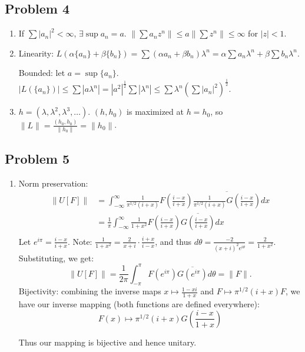 \documentclass[11pt]{article}
\newcommand{\intr}{\int_{-\infty}^{\infty}}
\begin{document}
\subsection*{Problem 4}
\begin{enumerate}
\item If $\sum|a_n|^2 < \infty$, $\exists \sup{a_n} = a$. $\|\sum a_nz^n\| \leq
  a\|\sum z^n\| \leq \infty$ for $|z| < 1$.
\item Linearity: $L(\alpha\{a_n\}+\beta\{b_n\}) = \sum(\alpha a_n + \beta b_n)
  \lambda^n = \alpha\sum a_n\lambda^n + \beta\sum b_n \lambda^n$.

  Bounded: let $a = \sup \{a_n\}$. $|L(\{a_n\})| \leq \sum|a\lambda^n| = 
  |a^2|^{\frac{1}{2}}\sum|\lambda^n| \leq \sum\lambda^n(\sum|a_n|^2)^{\frac{1}{2}}$.
\item $h = (\lambda, \lambda^2, \lambda^3,\ldots)$. $(h, h_0)$ is maximized at
  $h = h_0$, so $\|L\|=\frac{(h_0,h_0)}{\|h_0\|} = \|h_0\|$.
\end{enumerate}

\subsection*{Problem 5}
\begin{enumerate}[label=\alph*)]
\item Norm preservation:
  \begin{align*}
    \|U[F]\|
    &= \intr \frac{1}{\pi^{1/2}(i+x)}F\left(\frac{i-x}{i+x}\right)\overline{
      \frac{1}{\pi^{1/2}(i+x)}G\left(\frac{i-x}{i+x}\right)}dx\\
    &= \frac{1}{\pi}\intr\frac{1}{1+x^2}F\left(\frac{i-x}{i+x}\right)\overline{
      G\left(\frac{i-x}{i+x}\right)}dx\\
  \end{align*}
  Let $e^{i\pi} = \frac{i-x}{i+x}$. Note: $\frac{1}{1+x^2} = \frac{2}{x+i}\cdot
  \frac{i+x}{i-x}$, and thus $d\theta = \frac{-2}{(x+i)^2e^{i\theta}} = \frac{2}
    {1+x^2}$. Substituting, we get:
  \begin{displaymath}
    \|U[F]\|
    = \frac{1}{2\pi}\int_{-\pi}^{\pi}F(e^{i\pi})\overline{G(e^{i\pi})}d\theta =
    \|F\|.
  \end{displaymath}
  Bijectivity: combining the inverse maps $x\mapsto \frac{1-xi}{1+x}$ and $F
  \mapsto \pi^{1/2}(i+x)F$, we have our inverse mapping (both functions are
  defined everywhere):
  \begin{displaymath}
    F(x)\mapsto \pi^{1/2}(i+x)G\left(\frac{i - x}
      {1+x}\right)
  \end{displaymath}

  Thus our mapping is bijective and hence unitary.
\end{enumerate}
\end{document}
